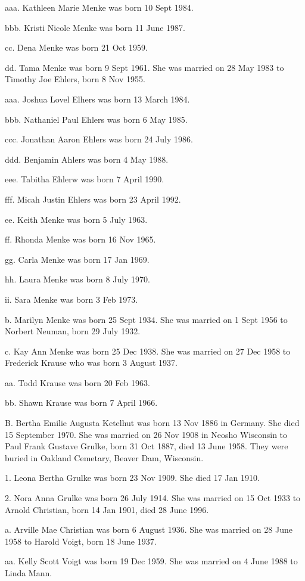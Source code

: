 \documentclass[a4paper]{article}
\begin{document}
aaa. Kathleen Marie Menke was born 10 Sept 1984.

bbb. Kristi Nicole Menke was born 11 June 1987.

cc. Dena Menke was born 21 Oct 1959.

dd. Tama Menke was born 9 Sept 1961.  She was married on 28 May 1983 to Timothy Joe Ehlers, born 8 Nov 1955.

aaa. Joshua Lovel Elhers was born 13 March 1984.

bbb. Nathaniel Paul Ehlers was born 6 May 1985.

ccc. Jonathan Aaron Ehlers was born 24 July 1986.

ddd. Benjamin Ahlers was born 4 May 1988.

eee. Tabitha Ehlerw was born 7 April 1990.

fff. Micah Justin Ehlers was born 23 April 1992.

ee. Keith Menke was born 5 July 1963.

ff. Rhonda Menke was born 16 Nov 1965.

gg. Carla Menke was born 17 Jan 1969.

hh. Laura Menke was born 8 July 1970.

ii. Sara Menke was born 3 Feb 1973.

b. Marilyn Menke was born 25 Sept 1934.  She was married on 1 Sept 1956 to Norbert Neuman, born 29 July 1932.

c. Kay Ann Menke was born 25 Dec 1938.  She was married on 27 Dec 1958 to Frederick Krause who was born 3 August 1937.

aa. Todd Krause was born 20 Feb 1963.

bb. Shawn Krause was born 7 April 1966.

B. Bertha Emilie Augusta Ketelhut was born 13 Nov 1886 in Germany.  She died 15 September 1970.  She was married on 26 Nov 1908 in Neosho Wisconsin to Paul Frank Gustave Grulke, born 31 Oct 1887, died 13 June 1958.  They were buried in Oakland Cemetary, Beaver Dam, Wisconsin.

1. Leona Bertha Grulke was born 23 Nov 1909.  She died 17 Jan 1910.

2. Nora Anna Grulke was born 26 July 1914.  She was married on 15 Oct 1933 to Arnold Christian, born 14 Jan 1901, died 28 June 1996.

a. Arville Mae Christian was born 6 August 1936.  She was married on 28 June 1958 to Harold Voigt, born 18 June 1937.

aa. Kelly Scott Voigt  was born 19 Dec 1959.  She was married on 4 June 1988 to Linda Mann.
\end{document}

